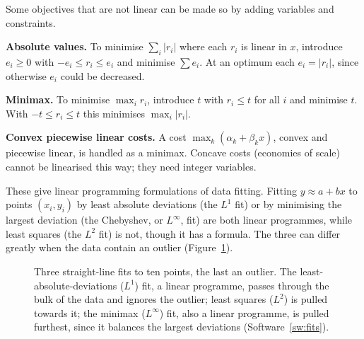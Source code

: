 \documentclass[11pt,a4paper]{article}
\numberwithin{equation}{section}
\theoremstyle{definition}
\begin{document}
Some objectives that are not linear can be made so by adding variables and constraints.

\textbf{Absolute values.} To minimise $\sum_i|r_i|$ where each $r_i$ is linear in $x$, introduce $e_i \geq 0$ with $-e_i \leq r_i \leq e_i$ and minimise $\sum e_i$. At an optimum each $e_i = |r_i|$, since otherwise $e_i$ could be decreased.

\textbf{Minimax.} To minimise $\max_ir_i$, introduce $t$ with $r_i \leq t$ for all $i$ and minimise $t$. With $-t \leq r_i \leq t$ this minimises $\max_i|r_i|$.

\textbf{Convex piecewise linear costs.} A cost $\max_k(\alpha_k + \beta_kx)$, convex and piecewise linear, is handled as a minimax. Concave costs (economies of scale) cannot be linearised this way; they need integer variables.

These give linear programming formulations of data fitting. Fitting $y \approx a + bx$ to points $(x_i, y_i)$ by least absolute deviations (the $L^1$ fit) or by minimising the largest deviation (the Chebyshev, or $L^\infty$, fit) are both linear programmes, while least squares (the $L^2$ fit) is not, though it has a formula.
The three can differ greatly when the data contain an outlier (Figure~\ref{fig:fits}).

\begin{figure}[H]
\centering
{}
\caption{Three straight-line fits to ten points, the last an outlier. The least-absolute-deviations ($L^1$) fit, a linear programme, passes through the bulk of the data and ignores the outlier; least squares ($L^2$) is pulled towards it; the minimax ($L^\infty$) fit, also a linear programme, is pulled
furthest, since it balances the largest deviations (Software~\ref{sw:fits}).}
\label{fig:fits}
\end{figure}
\end{document}
